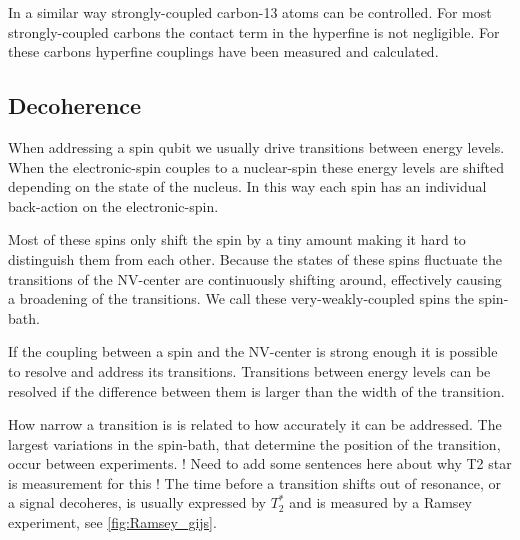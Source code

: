 In a similar way strongly-coupled carbon-13 atoms can be controlled\citep{Robledo2011HighFidelity}.
For most strongly-coupled carbons the contact term in the hyperfine is not negligible.
For these carbons hyperfine couplings have been measured\citep{Smeltzer201113} and calculated\citep{Gali2008Ab,Gali2009Identification}.

\subsection{Decoherence}


When addressing a spin qubit we usually drive transitions between energy levels.
When the electronic-spin couples to a nuclear-spin these energy levels are shifted depending on the state of the nucleus.
In this way each spin has an individual back-action on the electronic-spin.

Most of these spins only shift the spin by a tiny amount making it hard to distinguish them from each other.
Because the states of these spins fluctuate the transitions of the NV-center are continuously shifting around, effectively causing a broadening of the transitions.
We call these very-weakly-coupled spins the spin-bath.

If the coupling between a spin and the NV-center is strong enough it is possible to resolve and address its transitions.
Transitions between energy levels can be resolved if the difference between them is larger than the width of the transition.

How narrow a transition is is related to how accurately it can be addressed.
The largest variations in the spin-bath, that determine the position of the transition, occur between experiments.
!
Need to add some sentences here about why T2 star is measurement for this
!
The time before a transition shifts out of resonance, or a signal decoheres, is usually expressed by $T_2^*$ and is measured by a Ramsey experiment, see \cref{fig:Ramsey_gijs}.

